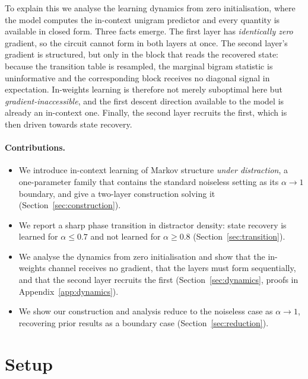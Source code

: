 To explain this we analyse the learning dynamics from zero initialisation, where the model
computes the in-context unigram predictor and every quantity is available in closed form. Three
facts emerge. The first layer has \emph{identically zero} gradient, so the circuit cannot form in
both layers at once. The second layer's gradient is structured, but only in the block that reads
the recovered state: because the transition table is resampled, the marginal bigram statistic is
uninformative and the corresponding block receives no diagonal signal in expectation. In-weights
learning is therefore not merely suboptimal here but \emph{gradient-inaccessible}, and the first
descent direction available to the model is already an in-context one. Finally, the second layer
recruits the first, which is then driven towards state recovery.

\paragraph{Contributions.}
\begin{itemize}
\item We introduce in-context learning of Markov structure \emph{under distraction}, a
one-parameter family that contains the standard noiseless setting as its $\alpha\to1$ boundary,
and give a two-layer construction solving it (Section~\ref{sec:construction}).
\item We report a sharp phase transition in distractor density: state recovery is learned for
$\alpha\le0.7$ and not learned for $\alpha\ge0.8$ (Section~\ref{sec:transition}).
\item We analyse the dynamics from zero initialisation and show that the in-weights channel
receives no gradient, that the layers must form sequentially, and that the second layer recruits
the first (Section~\ref{sec:dynamics}, proofs in Appendix~\ref{app:dynamics}).
\item We show our construction and analysis reduce to the noiseless case as $\alpha\to1$,
recovering prior results as a boundary case (Section~\ref{sec:reduction}).
\end{itemize}

\section{Setup}
\label{sec:setup}


